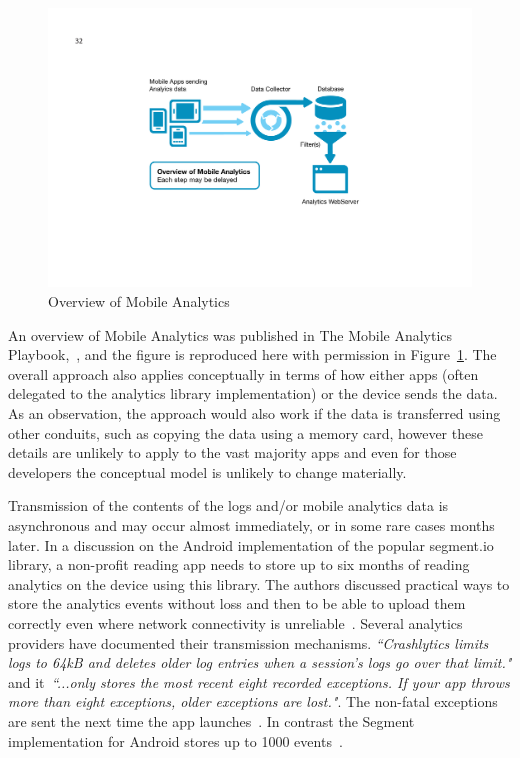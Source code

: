 \begin{figure}[htbp!]
    \centering
    \includegraphics[width=15cm]{images/mobile-analytics-playbook/Chart-08-Overview-of-MobileAnalytics.png}
    \caption{Overview of Mobile Analytics~\citep{harty_aymer_playbook_2016}}
    \label{fig:map2016-overview-of-mobile-analytics}
\end{figure}

An overview of Mobile Analytics was published in The Mobile Analytics Playbook,~\citep{harty_aymer_playbook_2016}, and the figure is reproduced here with permission in Figure~\ref{fig:map2016-overview-of-mobile-analytics}. The overall approach also applies conceptually in terms of how either apps (often delegated to the analytics library implementation) or the device sends the data. As an observation, the approach would also work if the data is transferred using other conduits, such as copying the data using a memory card, however these details are unlikely to apply to the vast majority apps and even for those developers the conceptual model is unlikely to change materially.

Transmission of the contents of the logs and/or mobile analytics data is asynchronous and may occur almost immediately, or in some rare cases months later. In a discussion on the Android implementation of the popular segment.io library, a non-profit reading app needs to store up to six months of reading analytics on the device using this library. The authors discussed practical ways to store the analytics events without loss and then to be able to upload them correctly even where network connectivity is unreliable~\citep{segmentio_supporting_6_months_offline}. Several analytics providers have documented their transmission mechanisms. \emph{``Crashlytics limits logs to 64kB and deletes older log entries when a session's logs go over that limit."} and it~\emph{``...only stores the most recent eight recorded exceptions. If your app throws more than eight exceptions, older exceptions are lost."}.  The non-fatal exceptions are sent the next time the app launches~\citep{firebasecrashlytics2020_customize_crash_reports}. In contrast the Segment implementation for Android stores up to 1000 events~\citep{segment_analytics_for_android_docs}.

